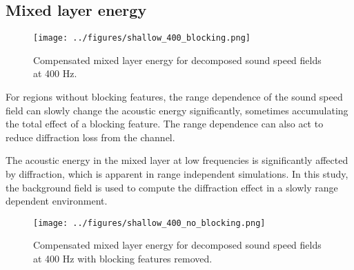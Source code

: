 \documentclass[preprint,NumberedRefs]{JASA}
\begin{document}
\subsection{Mixed layer energy}
\begin{figure}
\texttt{[image: ../figures/shallow\_400\_blocking.png]}
    \caption{Compensated mixed layer energy for decomposed sound speed fields at 400 Hz.}
    \label{fig:shal_400_b}
\end{figure}


For regions without blocking features, the range dependence of the sound speed field can slowly change the acoustic energy significantly, sometimes accumulating the total effect of a blocking feature. The range dependence can also act to reduce diffraction loss from the channel.

The acoustic energy in the mixed layer at low frequencies is significantly affected by diffraction, which is apparent in range independent simulations. In this study, the background field is used to compute the diffraction effect in a slowly range dependent environment.

\begin{figure}
\texttt{[image: ../figures/shallow\_400\_no\_blocking.png]}
    \caption{Compensated mixed layer energy for decomposed sound speed fields at 400 Hz with blocking features removed.}
    \label{fig:shal_400_b}
\end{figure}




\end{document}
